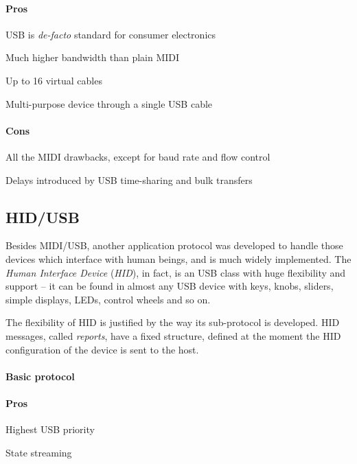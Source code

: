 \documentclass[a4paper,10pt]{article}
\begin{document}
\begin{multicols}{2}
\paragraph{Pros}
\begin{itemize*}
	\item USB is \emph{de-facto} standard for consumer electronics
	\item Much higher bandwidth than plain MIDI
	\item Up to 16 virtual cables
	\item Multi-purpose device through a single USB cable
\end{itemize*}


\paragraph{Cons}
\begin{itemize*}
	\item All the MIDI drawbacks, except for baud rate and flow control
	\item Delays introduced by USB time-sharing and bulk transfers
\end{itemize*}


\subsection{HID/USB}

Besides MIDI/USB, another application protocol was developed to handle those
devices which interface with human beings, and is much widely implemented.
The \emph{Human Interface Device} (\emph{HID}), in fact, is an USB class
with huge flexibility and support -- it can be found in almost any USB device
with keys, knobs, sliders, simple displays, LEDs, control wheels and so on.

The flexibility of HID is justified by the way its sub-protocol is developed.
HID messages, called \emph{reports}, have a fixed structure, defined at the
moment the HID configuration of the device is sent to the host.

\TODO


\paragraph{Basic protocol}
\TODO


\paragraph{Pros}
\begin{itemize*}
	\item Highest USB priority
	\item State streaming
	\item \TODO
\end{itemize*}



\end{multicols}
\end{document}
